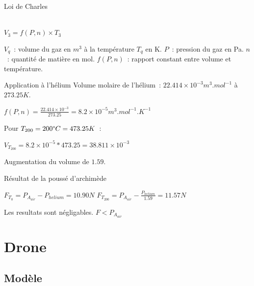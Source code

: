 \documentclass{beamer}
\begin{document}
\begin{frame}{Loi de Charles}
  \begin{center}
     \\
    $\displaystyle{V_3 = f(P, n) \times T_3}$
  \end{center}
  $V_q$~: volume du gaz en $m^3$ à la température $T_q$ en K. $P$~: pression du gaz en Pa. $n$~: quantité de matière en mol. $f(P, n)$~: rapport constant entre volume et température.
\end{frame}

\begin{frame}{Application à l'hélium}
  Volume molaire de l'hélium~: $22.414\times 10^{-3} m^3.mol^{-1}$ à $273.25K$.
  \begin{center}
    $\displaystyle{f(P, n) = \frac{22.414\times 10^{-3}}{273.25} = 8.2\times 10^{-5} m^3.mol^{-1}.K^{-1}}$
  \end{center}
  Pour $T_{200} = 200 \degree C = 473.25 K$~:
  \begin{center}
    $\displaystyle{V_{T_{200}} = 8.2\times 10^{-5} * 473.25 = 38.811 \times 10^{-3}}$
  \end{center}
  Augmentation du volume de $1.59$.
\end{frame}

\begin{frame}{Résultat de la poussé d'archimède}
  \begin{center}
    $\displaystyle{F_{T_0} = P_{A_{air}} - P_{helium} = 10.90 N}$
    \bigbreak
    $\displaystyle{F_{T_{200}} = P_{A_{air}} - \frac{P_{helium}}{1.59} = 11.57 N}$ \\
  \end{center}
  Les resultats sont négligables. $F < P_{A_{air}}$
\end{frame}

\section{Drone}

\subsection{Modèle}
\end{document}
